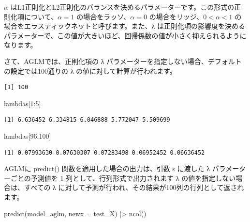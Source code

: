 \documentclass[
  letterpaper,
  DIV=11,
  numbers=noendperiod]{scrreprt}
\newenvironment{Shaded}{\begin{snugshade}}{\end{snugshade}}
\newcommand{\AttributeTok}[1]{\textcolor[rgb]{0.40,0.45,0.13}{#1}}
\newcommand{\DecValTok}[1]{\textcolor[rgb]{0.68,0.00,0.00}{#1}}
\newcommand{\FunctionTok}[1]{\textcolor[rgb]{0.28,0.35,0.67}{#1}}
\newcommand{\NormalTok}[1]{\textcolor[rgb]{0.00,0.23,0.31}{#1}}
\newcommand{\OtherTok}[1]{\textcolor[rgb]{0.00,0.23,0.31}{#1}}
\newcommand{\SpecialCharTok}[1]{\textcolor[rgb]{0.37,0.37,0.37}{#1}}
\begin{document}
\(\alpha\)
はL1正則化とL2正則化のバランスを決めるパラメーターです。この形式の正則化項について、\(\alpha=1\)
の場合をラッソ、\(\alpha=0\) の場合をリッジ、\(0<\alpha<1\)
の場合をエラスティックネットと呼びます。また、λ
は正則化項の影響度を決めるパラメーターで、この値が大きいほど、回帰係数の値が小さく抑えられるようになります。

さて、AGLMでは、正則化項の λ
パラメーターを指定しない場合、デフォルトの設定では100通りの λ
の値に対して計算が行われます。

\begin{Shaded}
\end{Shaded}

\begin{verbatim}
[1] 100
\end{verbatim}

\begin{Shaded}
\begin{Highlighting}[]
\NormalTok{lambdas[}\DecValTok{1}\SpecialCharTok{:}\DecValTok{5}\NormalTok{]}
\end{Highlighting}
\end{Shaded}

\begin{verbatim}
[1] 6.636452 6.334815 6.046888 5.772047 5.509699
\end{verbatim}

\begin{Shaded}
\begin{Highlighting}[]
\NormalTok{lambdas[}\DecValTok{96}\SpecialCharTok{:}\DecValTok{100}\NormalTok{]}
\end{Highlighting}
\end{Shaded}

\begin{verbatim}
[1] 0.07993630 0.07630307 0.07283498 0.06952452 0.06636452
\end{verbatim}

AGLMに predict() 関数を適用した場合の出力は、引数 s に渡した λ
パラメーターごとの予測値を 1 列として、行列形式で出力されます λ
の値を指定しない場合は、すべての λ
に対して予測が行われ、その結果が100列の行列として返されます。

\begin{Shaded}
\begin{Highlighting}[]
\FunctionTok{predict}\NormalTok{(model\_aglm, }\AttributeTok{newx =}\NormalTok{ test\_X) }\SpecialCharTok{|\textgreater{}} \FunctionTok{ncol}\NormalTok{()}
\end{Highlighting}
\end{Shaded}
\end{document}
